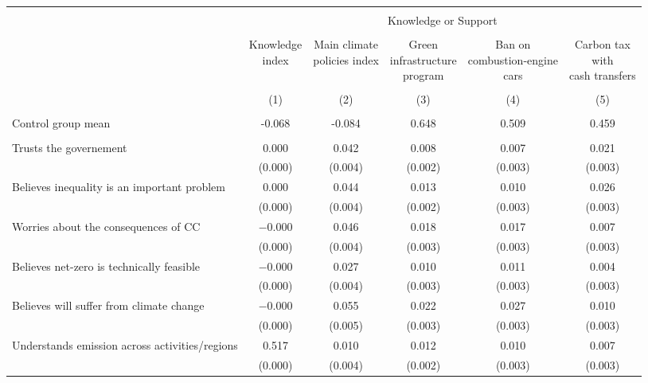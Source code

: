 
\begin{tabular}{@{\extracolsep{5pt}}lccccc} 
\\[-1.8ex]\hline 
\hline \\[-1.8ex] 
 & \multicolumn{5}{c}{Knowledge or Support} \\ 
\cline{2-6} 
\\[-1.8ex] & \makecell{Knowledge\\index} & \makecell{Main climate\\policies index} & \makecell{Green\\infrastructure\\program} & \makecell{Ban on\\combustion-engine\\cars} & \makecell{Carbon tax\\with\\cash transfers} \\ 
\\[-1.8ex] & (1) & (2) & (3) & (4) & (5)\\ 
\hline \\[-1.8ex] 
Control group mean & -0.068 & -0.084 & 0.648 & 0.509 & 0.459  \\ \hline \\[-1.8ex]
 Trusts the governement & 0.000 & 0.042 & 0.008 & 0.007 & 0.021 \\ 
  & (0.000) & (0.004) & (0.002) & (0.003) & (0.003) \\ 
  Believes inequality is an important problem & 0.000 & 0.044 & 0.013 & 0.010 & 0.026 \\ 
  & (0.000) & (0.004) & (0.002) & (0.003) & (0.003) \\ 
  Worries about the consequences of CC & $-$0.000 & 0.046 & 0.018 & 0.017 & 0.007 \\ 
  & (0.000) & (0.004) & (0.003) & (0.003) & (0.003) \\ 
  Believes net-zero is technically feasible & $-$0.000 & 0.027 & 0.010 & 0.011 & 0.004 \\ 
  & (0.000) & (0.004) & (0.003) & (0.003) & (0.003) \\ 
  Believes will suffer from climate change & $-$0.000 & 0.055 & 0.022 & 0.027 & 0.010 \\ 
  & (0.000) & (0.005) & (0.003) & (0.003) & (0.003) \\ 
  Understands emission across activities/regions & 0.517 & 0.010 & 0.012 & 0.010 & 0.007 \\ 
  & (0.000) & (0.004) & (0.002) & (0.003) & (0.003) \\ 

\end{tabular}

